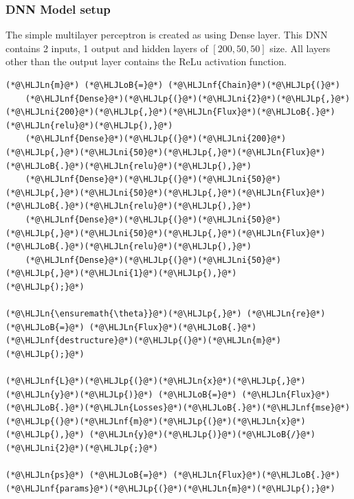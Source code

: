 \documentclass[12pt,a4paper]{article}
\newcommand{\HLJLn}[1]{#1}
\newcommand{\HLJLnf}[1]{\textcolor[RGB]{66,102,213}{#1}}
\newcommand{\HLJLni}[1]{\textcolor[RGB]{59,151,46}{#1}}
\newcommand{\HLJLoB}[1]{\textcolor[RGB]{102,102,102}{\textbf{#1}}}
\newcommand{\HLJLp}[1]{#1}
\begin{document}
\subsubsection{DNN Model setup}
The simple multilayer perceptron is created as using Dense layer. This DNN contains 2 inputs, 1 output and hidden layers of $[200,50,50]$ size. All layers other than the output layer contains the ReLu activation function.


\begin{lstlisting}
(*@\HLJLn{m}@*) (*@\HLJLoB{=}@*) (*@\HLJLnf{Chain}@*)(*@\HLJLp{(}@*)
    (*@\HLJLnf{Dense}@*)(*@\HLJLp{(}@*)(*@\HLJLni{2}@*)(*@\HLJLp{,}@*)(*@\HLJLni{200}@*)(*@\HLJLp{,}@*)(*@\HLJLn{Flux}@*)(*@\HLJLoB{.}@*)(*@\HLJLn{relu}@*)(*@\HLJLp{),}@*) 
    (*@\HLJLnf{Dense}@*)(*@\HLJLp{(}@*)(*@\HLJLni{200}@*)(*@\HLJLp{,}@*)(*@\HLJLni{50}@*)(*@\HLJLp{,}@*)(*@\HLJLn{Flux}@*)(*@\HLJLoB{.}@*)(*@\HLJLn{relu}@*)(*@\HLJLp{),}@*)
    (*@\HLJLnf{Dense}@*)(*@\HLJLp{(}@*)(*@\HLJLni{50}@*)(*@\HLJLp{,}@*)(*@\HLJLni{50}@*)(*@\HLJLp{,}@*)(*@\HLJLn{Flux}@*)(*@\HLJLoB{.}@*)(*@\HLJLn{relu}@*)(*@\HLJLp{),}@*)
    (*@\HLJLnf{Dense}@*)(*@\HLJLp{(}@*)(*@\HLJLni{50}@*)(*@\HLJLp{,}@*)(*@\HLJLni{50}@*)(*@\HLJLp{,}@*)(*@\HLJLn{Flux}@*)(*@\HLJLoB{.}@*)(*@\HLJLn{relu}@*)(*@\HLJLp{),}@*)
    (*@\HLJLnf{Dense}@*)(*@\HLJLp{(}@*)(*@\HLJLni{50}@*)(*@\HLJLp{,}@*)(*@\HLJLni{1}@*)(*@\HLJLp{),}@*)
(*@\HLJLp{);}@*)

(*@\HLJLn{\ensuremath{\theta}}@*)(*@\HLJLp{,}@*) (*@\HLJLn{re}@*) (*@\HLJLoB{=}@*) (*@\HLJLn{Flux}@*)(*@\HLJLoB{.}@*)(*@\HLJLnf{destructure}@*)(*@\HLJLp{(}@*)(*@\HLJLn{m}@*)(*@\HLJLp{);}@*)

(*@\HLJLnf{L}@*)(*@\HLJLp{(}@*)(*@\HLJLn{x}@*)(*@\HLJLp{,}@*) (*@\HLJLn{y}@*)(*@\HLJLp{)}@*) (*@\HLJLoB{=}@*) (*@\HLJLn{Flux}@*)(*@\HLJLoB{.}@*)(*@\HLJLn{Losses}@*)(*@\HLJLoB{.}@*)(*@\HLJLnf{mse}@*)(*@\HLJLp{(}@*)(*@\HLJLnf{m}@*)(*@\HLJLp{(}@*)(*@\HLJLn{x}@*)(*@\HLJLp{),}@*) (*@\HLJLn{y}@*)(*@\HLJLp{)}@*)(*@\HLJLoB{/}@*)(*@\HLJLni{2}@*)(*@\HLJLp{;}@*)

(*@\HLJLn{ps}@*) (*@\HLJLoB{=}@*) (*@\HLJLn{Flux}@*)(*@\HLJLoB{.}@*)(*@\HLJLnf{params}@*)(*@\HLJLp{(}@*)(*@\HLJLn{m}@*)(*@\HLJLp{);}@*)


\end{lstlisting}
\end{document}
